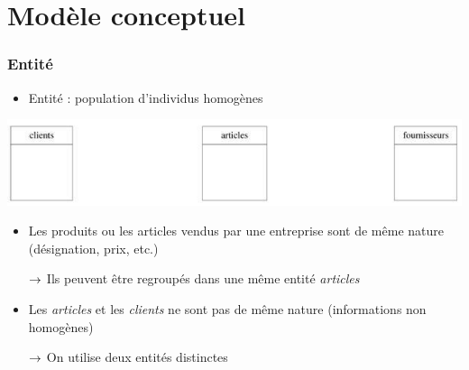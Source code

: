 \section[Modèle conceptuel]{Modèle conceptuel}


\begin{frame}
  \frametitle{Entité}
  \begin{itemize}
    \item Entité : population d'individus homogènes
  \end{itemize}
  \begin{center}
    \includegraphics[width=0.9\linewidth]{entite.jpg}
  \end{center}
  \begin{itemize}
    \item Les produits ou les articles vendus par une entreprise sont de même nature (désignation, prix, etc.)
    \item[$\rightarrow$] Ils peuvent être regroupés dans une même entité \emph{articles}
    \item Les \emph{articles} et les \emph{clients} ne sont pas de même nature (informations non homogènes)
    \item[$\rightarrow$] On utilise deux entités distinctes
  \end{itemize}
\end{frame}

